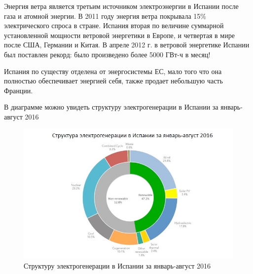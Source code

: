 Энергия ветра является третьим источником электроэнергии в Испании после газа и атомной энергии. В 2011 году энергия ветра покрывала 15\% электрического спроса в стране. Испания вторая по величине суммарной установленной мощности ветровой энергетики в Европе, и четвертая в мире после США, Германии и Китая.
В апреле 2012 г. в ветровой энергетике Испании был поставлен рекорд: было произведено более 5000 ГВт-ч в месяц!

Испания по существу отделена от энергосистемы ЕС, мало того что она полностью обеспечивает энергией себя, также продает небольшую часть Франции.

В диаграмме  можно увидеть структуру электрогенерации в Испании за январь-август 2016

\begin{figure}[h]
	\begin{center}
		\includegraphics[width=.5\columnwidth]{./img/Spain-energy.jpg}
	\end{center}
	\caption{Структуру электрогенерации в Испании за январь-август 2016}
	\label{pic:struct_energy}
\end{figure}










